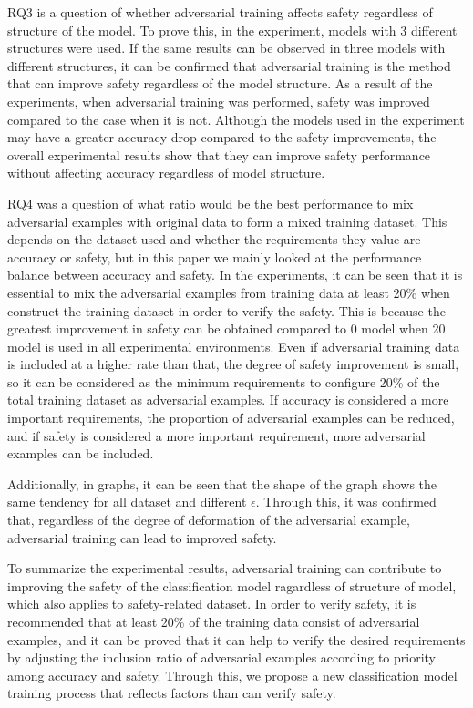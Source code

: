 \documentclass[journal,article,submit,moreauthors,pdftex]{Definitions/mdpi}
\begin{document}
RQ3 is a question of whether adversarial training affects safety regardless of structure of the model.
To prove this, in the experiment, models with 3 different structures were used.
If the same results can be observed in three models with different structures, it can be confirmed that adversarial training is the method that can improve safety regardless of the model structure.
As a result of the experiments, when adversarial training was performed, safety was improved compared to the case when it is not.
Although the models used in the experiment may have a greater accuracy drop compared to the safety improvements, the overall experimental results show that they can improve safety performance without affecting accuracy regardless of model structure.

RQ4 was a question of what ratio would be the best performance to mix adversarial examples with original data to form a mixed training dataset.
This depends on the dataset used and whether the requirements they value are accuracy or safety, but in this paper we mainly looked at the performance balance between accuracy and safety.
In the experiments, it can be seen that it is essential to mix the adversarial examples from training data at least 20\% when construct the training dataset in order to verify the safety.
This is because the greatest improvement in safety can be obtained compared to 0 model when 20 model is used in all experimental environments.
Even if adversarial training data is included at a higher rate than that, the degree of safety improvement is small, so it can be considered as the minimum requirements to configure 20\% of the total training dataset as adversarial examples.
If accuracy is considered a more important requirements, the proportion of adversarial examples can be reduced, and if safety is considered a more important requirement, more adversarial examples can be included.

Additionally, in graphs, it can be seen that the shape of the graph shows the same tendency for all dataset and different \begin{math}\epsilon\end{math}.
Through this, it was confirmed that, regardless of the degree of deformation of the adversarial example, adversarial training can lead to improved safety.

To summarize the experimental results, adversarial training can contribute to improving the safety of the classification model ragardless of structure of model, which also applies to safety-related dataset.
In order to verify safety, it is recommended that at least 20\% of the training data consist of adversarial examples, and it can be proved that it can help to verify the desired requirements by adjusting the inclusion ratio of adversarial examples according to priority among accuracy and safety.
Through this, we propose a new classification model training process that reflects factors than can verify safety.
\end{document}
